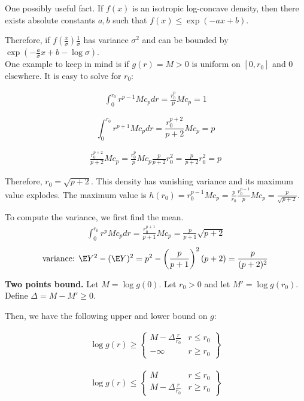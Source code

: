 \documentclass{article}
\begin{document}
One possibly useful fact. If $f(x)$ is an isotropic log-concave density, then there exists absolute constants $a,b$ such that $f(x) \leq \exp( - a x + b)$. 

Therefore, if $f( \frac{x}{\sigma} ) \frac{1}{\sigma}$ has variance $\sigma^2$ and can be bounded by $\exp( - \frac{a}{\sigma} x + b - \log \sigma)$. \\




One example to keep in mind is if $g(r) = M > 0$ is uniform on $[0, r_0]$ and $0$ elsewhere. It is easy to solve for $r_0$:

\begin{align*}
\int_0^{r_0} r^{p-1} M c_p dr = \frac{r_0^p}{p} M c_p = 1
\end{align*}

\[
\int_0^{r_0} r^{p+1} M c_p dr = \frac{r_0^{p+2}}{p+2} M c_p = p 
\]

\begin{align*}
\frac{r_0^{p+2}}{p+2} M c_p = \frac{r_0^p}{p} M c_p \frac{p}{p+2} r_0^2 = \frac{p}{p+2} r_0^2 = p
\end{align*}

Therefore, $r_0 = \sqrt{p+2}$. This density has vanishing variance and its maximum value explodes. The maximum value is $h(r_0) = r_0^{p-1} M c_p = \frac{p}{r_0} \frac{r_0^{p-1}}{p} M c_p = \frac{p}{\sqrt{p+2}}$. 

To compute the variance, we first find the mean.
\begin{align*}
\int_0^{r_0} r^p M c_p dr = \frac{r_0^{p+1}}{p+1} M c_p = \frac{p}{p+1} \sqrt{p+2} 
\end{align*}
\[
\textrm{variance: } \E Y^2 - (\E Y)^2 = p^2 - \left(\frac{p}{p+1} \right)^2 (p+2) = \frac{p}{(p+2)^2}
\]


\textbf{Two points bound.} Let $M = \log g(0)$. Let $r_0 > 0$ and let $M' = \log g(r_0)$. Define $\Delta = M - M' \geq 0$. 

Then, we have the following upper and lower bound on $g$:

\begin{align*}
\log g(r) \geq \left\{ \begin{array}{cc} M - \Delta \frac{r}{r_0}   & r \leq r_0 \\
                             -\infty & r \geq r_0 \end{array} \right\}
\end{align*}

\begin{align*}
\log g(r) \leq \left\{ \begin{array}{cc} M & r \leq r_0 \\
                         M - \Delta \frac{r}{r_0} & r \geq r_0 
                      \end{array} \right\}
\end{align*}
\end{document}
